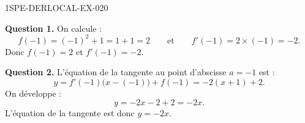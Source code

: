 \begin{corrige}{1SPE-DERLOCAL-EX-020}

\textbf{Question 1.} On calcule :
\[
f(-1) = (-1)^2 + 1 = 1 + 1 = 2 \qquad \text{et} \qquad f'(-1) = 2 \times (-1) = -2.
\]
Donc $\boxed{f(-1) = 2}$ et $\boxed{f'(-1) = -2}$.

\textbf{Question 2.} L'équation de la tangente au point d'abscisse $a = -1$ est :
\[
y = f'(-1)\bigl(x - (-1)\bigr) + f(-1) = -2(x + 1) + 2.
\]
On développe :
\[
y = -2x - 2 + 2 = -2x.
\]
L'équation de la tangente est donc $\boxed{y = -2x}$.

\end{corrige}
